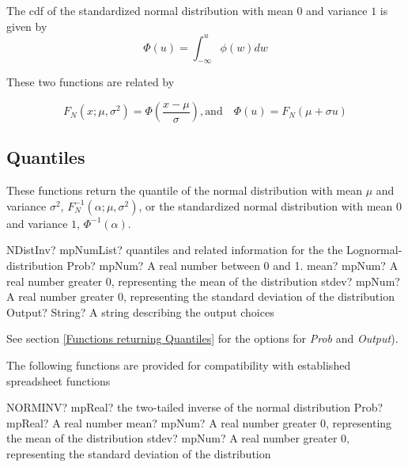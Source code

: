 The cdf of the standardized normal distribution with mean $0$ and variance $1$ is given by
\begin{equation}
	\Phi(u) = \int_{-\infty}^u \phi(w) dw
\end{equation}

These two functions are related by

\begin{equation} 
	F_N(x; \mu, \sigma^2) =  \Phi \left(\frac{x-\mu}{\sigma} \right), \text{and} \quad  \Phi(u) = F_N(\mu + \sigma u)
\end{equation}




\subsection{Quantiles}
\label{sec:NormalDistribution_Quantiles}

These functions return the quantile of the normal distribution with  mean $\mu$ and variance $\sigma^2$, $F_N^{-1}(\alpha; \mu, \sigma^2)$, or the standardized normal distribution with mean $0$ and variance $1$, $\Phi^{-1}(\alpha)$.

\vspace{0.3cm}
\begin{mpFunctionsExtract}
	\mpFunctionFourNotImplemented
	{NDistInv? mpNumList? quantiles and related information for the the Lognormal-distribution}
	{Prob? mpNum? A real number between 0 and 1.}
	{mean? mpNum? A real number greater 0, representing the mean of the distribution}
	{stdev? mpNum? A real number greater 0, representing the standard deviation of the distribution}
	{Output? String? A string describing the output choices}
\end{mpFunctionsExtract}

See section \ref{Functions returning Quantiles} for the options for  {\itshape\sffamily Prob} and {\itshape\sffamily Output}). 


\vspace{0.6cm}

The following functions are provided for compatibility with established spreadsheet functions

\vspace{0.3cm}
\begin{mpFunctionsExtract}
	\mpWorksheetFunctionThreeNotImplemented
	{NORMINV? mpReal? the two-tailed inverse of the normal distribution}
	{Prob? mpReal? A real number}
	{mean? mpNum? A real number greater 0, representing the mean of the distribution}
	{stdev? mpNum? A real number greater 0, representing the standard deviation of the distribution}
\end{mpFunctionsExtract}

